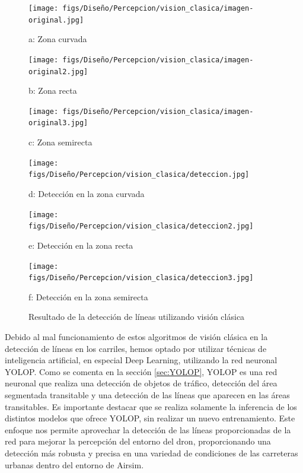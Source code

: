 \begin{figure}[H]
  \centering
  \begin{minipage}[t]{0.3\textwidth}
      \centering
      \texttt{[image: figs/Diseño/Percepcion/vision\_clasica/imagen-original.jpg]}
      \caption*{a: Zona curvada}
  \end{minipage}
  \hfill
  \begin{minipage}[t]{0.3\textwidth}
      \centering
      \texttt{[image: figs/Diseño/Percepcion/vision\_clasica/imagen-original2.jpg]}
      \caption*{b: Zona recta}
  \end{minipage}
  \hfill
  \begin{minipage}[t]{0.3\textwidth}
      \centering
      \texttt{[image: figs/Diseño/Percepcion/vision\_clasica/imagen-original3.jpg]}
      \caption*{c: Zona semirecta}
  \end{minipage}
  
  \vspace{1cm}
  
  \begin{minipage}[t]{0.3\textwidth}
      \centering
      \texttt{[image: figs/Diseño/Percepcion/vision\_clasica/deteccion.jpg]}
      \caption*{d: Detección en la zona curvada}
  \end{minipage}
  \hfill
  \begin{minipage}[t]{0.3\textwidth}
      \centering
      \texttt{[image: figs/Diseño/Percepcion/vision\_clasica/deteccion2.jpg]}
      \caption*{e: Detección en la zona recta}
  \end{minipage}
  \hfill
  \begin{minipage}[t]{0.3\textwidth}
      \centering
      \texttt{[image: figs/Diseño/Percepcion/vision\_clasica/deteccion3.jpg]}
      \caption*{f: Detección en la zona semirecta}
  \end{minipage}
  \caption{Resultado de la detección de líneas utilizando visión clásica}
  \label{Vision_clasica}
\end{figure}

Debido al mal funcionamiento de estos algoritmos de visión clásica en la detección de líneas en los carriles, 
hemos optado por utilizar técnicas de inteligencia artificial, en especial Deep Learning, utilizando la red neuronal YOLOP. Como se comenta en la sección \ref{sec:YOLOP}, 
YOLOP es una red neuronal que realiza una detección de objetos de tráfico, detección del área segmentada transitable y una detección de las líneas que aparecen en las áreas transitables. Es importante 
destacar que se realiza solamente la inferencia de los distintos modelos que ofrece YOLOP, sin realizar un nuevo entrenamiento. Este enfoque nos permite aprovechar 
la detección de las líneas proporcionadas de la red para mejorar la percepción del entorno del dron, proporcionando una detección más robusta y precisa en una variedad de condiciones
de las carreteras urbanas dentro del entorno de Airsim. 

